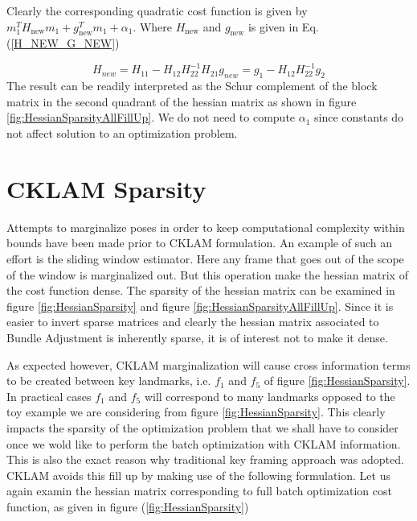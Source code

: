 Clearly the corresponding quadratic cost function is given by $m_1^TH_\mathrm{new}m_1 + g_\mathrm{new}^Tm_1 + \alpha_1$. Where $H_\mathrm{new}$ and $g_\mathrm{new}$ is given in Eq.(\ref{H_NEW_G_NEW})

\begin{subequations}
	\begin{equation}
		H_{new} = H_{11} - H_{12}H_{22}^{-1}H_{21}
	\end{equation}

	\begin{equation}
		g_{new} = g_1 - H_{12}H_{22}^{-1}g_2
	\end{equation}
	\label{H_NEW_G_NEW}
\end{subequations}
The result can be readily interpreted as the Schur complement of the block matrix in the second quadrant of the hessian matrix as shown in figure \ref{fig:HessianSparsityAllFillUp}. We do not need to compute $\alpha_1$ since constants do not affect solution to an optimization problem.

\section{CKLAM Sparsity}
Attempts to marginalize poses in order to keep computational complexity within bounds have been made prior to CKLAM formulation. An example of such an effort is the sliding window estimator. Here any frame that goes out of the scope of the window is marginalized out. But this operation make the hessian matrix of the cost function dense. The sparsity of the hessian matrix can be examined in figure \ref{fig:HessianSparsity} and figure \ref{fig:HessianSparsityAllFillUp}. Since it is easier to invert sparse matrices and clearly the hessian matrix associated to Bundle Adjustment is inherently sparse, it is of interest not to make it dense.

As expected however, CKLAM marginalization will cause cross information terms to be created between key landmarks, i.e. $f_1$ and $f_5$ of figure \ref{fig:HessianSparsity}. In practical cases $f_1$ and $f_5$ will correspond to many landmarks opposed to the toy example we are considering from figure \ref{fig:HessianSparsity}. This clearly impacts the sparsity of the optimization problem that we shall have to consider once we wold like to perform the batch optimization with CKLAM information. This is also the exact reason why traditional key framing approach was adopted. CKLAM avoids this fill up by making use of the following formulation. Let us again examin the hessian matrix corresponding to full batch optimization cost function, as given in figure (\ref{fig:HessianSparsity})

